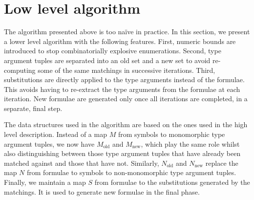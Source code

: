 \documentclass[runningheads]{llncs}
\begin{document}
\section{Low level algorithm}
\label{sec:low-level-algorithm}

The algorithm presented above is too naïve in practice. In this section, we present a lower level algorithm with the following features.
First, numeric bounds are introduced to stop combinatorially explosive enumerations.
Second, type argument tuples are separated into an old set and a new set to avoid re-computing some of the same matchings in successive iterations.
Third, substitutions are directly applied to the type arguments instead of the formulae. This avoids having to re-extract the type arguments from the formulae at each iteration. New formulae are generated only once all iterations are completed, in a separate, final step.

The data structures used in the algorithm are based on the ones used in the high level description. Instead of a map \(M\) from symbols to monomorphic type argument tuples, we now have \(M_\text{old}\) and \(M_\text{new}\), which play the same role whilst also distinguishing between those type argument tuples that have already been matched against and those that have not. Similarly, \(N_\text{old}\) and \(N_\text{new}\) replace the map \(N\) from formulae to symbols to non-monomorphic type argument tuples. Finally, we maintain a map \(S\) from formulae to the substitutions generated by the matchings. It is used to generate new formulae in the final phase.
\end{document}
